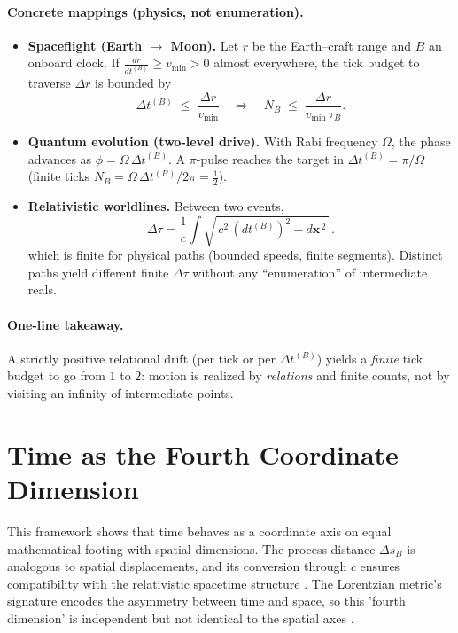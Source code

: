 \documentclass[12pt]{article}
\begin{document}
\paragraph{Concrete mappings (physics, not enumeration).}
\begin{itemize}
  \item \textbf{Spaceflight (Earth \(\to\) Moon).} Let \(r\) be the Earth–craft range and
  \(B\) an onboard clock. If
  \(\frac{dr}{dt^{(B)}} \ge v_{\min} > 0\) almost everywhere, the tick budget to traverse
  \(\Delta r\) is bounded by
  \[
  \Delta t^{(B)} \;\le\; \frac{\Delta r}{v_{\min}}
  \quad\Rightarrow\quad
  N_B \;\le\; \frac{\Delta r}{v_{\min}\,\tau_B}.
  \]
  \item \textbf{Quantum evolution (two-level drive).} With Rabi frequency \(\Omega\),
  the phase advances as \(\phi=\Omega\,\Delta t^{(B)}\). A \(\pi\)-pulse reaches the target in
  \(\Delta t^{(B)}=\pi/\Omega\) (finite ticks \(N_B=\Omega\,\Delta t^{(B)}/2\pi=\tfrac12\)).
  \item \textbf{Relativistic worldlines.} Between two events,
  \[
  \Delta \tau = \frac{1}{c}\!\int \sqrt{\,c^2\,(dt^{(B)})^2 - d\mathbf x^{\,2}\,}\,.
  \]
  which is finite for physical paths (bounded speeds, finite segments). Distinct paths yield
  different finite \(\Delta\tau\) without any ``enumeration'' of intermediate reals.
\end{itemize}

\paragraph{One-line takeaway.}
A strictly positive relational drift (per tick or per \(\Delta t^{(B)}\)) yields a \emph{finite}
tick budget to go from \(1\) to \(2\): motion is realized by \emph{relations} and finite counts,
not by visiting an infinity of intermediate points.

\section{Time as the Fourth Coordinate Dimension}

This framework shows that time behaves as a coordinate axis on equal mathematical footing with spatial dimensions. The process distance \(\Delta s_B\) is analogous to spatial displacements, and its conversion through \(c\) ensures compatibility with the relativistic spacetime structure \cite{Minkowski1908,Rindler2006}. The Lorentzian metric’s signature encodes the asymmetry between time and space, so this 'fourth dimension' is independent but not identical to the spatial axes \cite{Rindler2006}.
\end{document}

